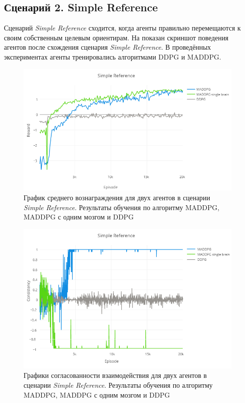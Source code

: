 \subsection{Сценарий 2. Simple Reference}

Сценарий \textit{Simple Reference} сходится, когда агенты правильно перемещаются к своим собственным целевым ориентирам. На  показан скриншот поведения агентов после схождения сценария \textit{Simple Reference}. В проведённых экспериментах агенты тренировались алгоритмами DDPG и MADDPG.

\begin{figure}[ht!]
    \center
    \includegraphics [scale=0.6] {my_folder/images/ch5/sr-rew.png}
    \caption{График среднего вознаграждения для двух агентов в сценарии \textit{Simple Reference}. Результаты обучения по алгоритму MADDPG, MADDPG с одним мозгом и DDPG}
    \label{fig:result-sr-rew}
\end{figure}

\begin{figure}[ht!]
    \center
    \includegraphics [scale=0.6] {my_folder/images/ch5/sr-comm.png}
    \caption{Графики согласованности взаимодействия для двух агентов в сценарии \textit{Simple Reference}. Результаты обучения по алгоритму MADDPG, MADDPG с одним мозгом и DDPG}
    \label{fig:result-sr-comm}
\end{figure}

